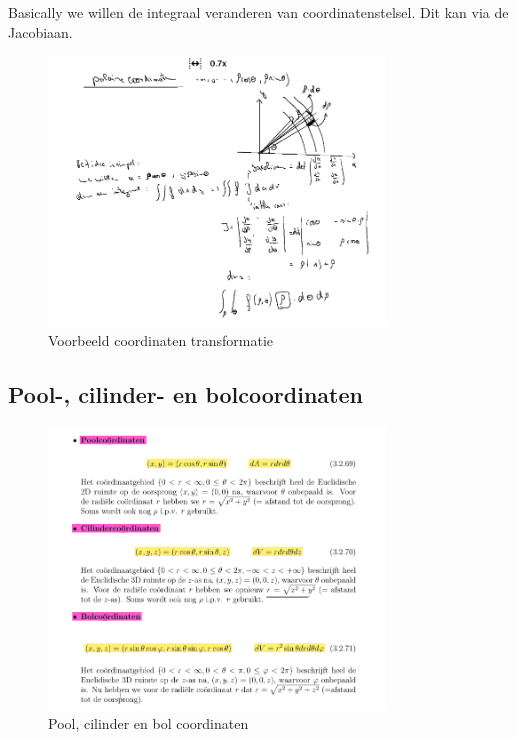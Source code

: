 \documentclass[a4paper]{article}
\begin{document}
Basically we willen de integraal veranderen van coordinatenstelsel. Dit kan via de Jacobiaan.


\begin{figure}[H]
	\centering
	\includegraphics[width=0.8\textwidth]{assets/voorbeeld_coordinaten_transfo_integralen.png}
	\caption{Voorbeeld coordinaten transformatie}
	\label{fig:voorbeeld_coordinaten_transfo_integralen}
\end{figure}


\subsection{Pool-, cilinder- en bolcoordinaten}


\begin{figure}[H]
	\centering
	\includegraphics[width=0.8\textwidth]{assets/pool_cilinder_bol_coordinaten.png}
	\caption{Pool, cilinder en bol coordinaten}
	\label{fig:pool_cilinder_bol_coordinaten}
\end{figure}
\end{document}
